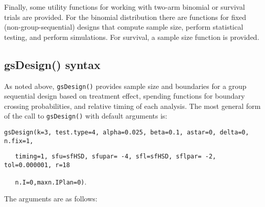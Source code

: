 Finally, some utility functions for working with two-arm binomial or survival
trials are provided. For the binomial distribution there are functions for
fixed (non-group-sequential) designs that compute sample size, perform
statistical testing, and perform simulations. For survival, a sample size
function is provided.

\subsection{gsDesign() syntax}

As noted above, \texttt{gsDesign()} provides sample size and boundaries for a
group sequential design based on treatment effect, spending functions for
boundary crossing probabilities, and relative timing of each analysis. The
most general form of the call to \texttt{gsDesign()} with default arguments is:

\bigskip

\texttt{gsDesign(k=3, test.type=4, alpha=0.025, beta=0.1, astar=0, delta=0,
n.fix=1,}

\texttt{\ \ \ timing=1, sfu=sfHSD, sfupar= -4, sfl=sfHSD, sflpar= -2,
tol=0.000001, r=18}

\texttt{\ \ \ n.I=0,maxn.IPlan=0)}.

\bigskip

The arguments are as follows:


